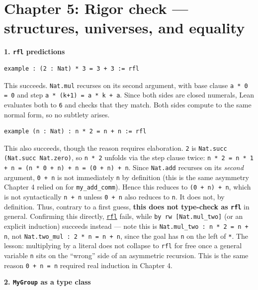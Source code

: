 \section{Chapter 5: Rigor check --- structures, universes, and equality}\label{sec:14-appendix-solutions:04-chapter-5:1}

\textbf{1. \texttt{rfl} predictions}

\begin{lstlisting}
example : (2 : Nat) * 3 = 3 + 3 := rfl
\end{lstlisting}

This succeeds. \texttt{Nat.mul} recurses on its second argument, with base clause \texttt{a * 0 = 0} and step \texttt{a * (k+1) = a * k + a}. Since both sides are closed numerals, Lean evaluates both to \texttt{6} and checks that they match. Both sides compute to the same normal form, so no subtlety arises.

\begin{lstlisting}
example (n : Nat) : n * 2 = n + n := rfl
\end{lstlisting}

This also succeeds, though the reason requires elaboration. \texttt{2} is \texttt{Nat.succ (Nat.succ Nat.zero)}, so \texttt{n * 2} unfolds via the step clause twice: \texttt{n * 2 = n * 1 + n = (n * 0 + n) + n = (0 + n) + n}. Since \texttt{Nat.add} recurses on its \emph{second} argument, \texttt{0 + n} is not immediately \texttt{n} by definition (this is the same asymmetry Chapter 4 relied on for \texttt{my\_\allowbreak{}add\_\allowbreak{}comm}). Hence this reduces to \texttt{(0 + n) + n}, which is not syntactically \texttt{n + n} unless \texttt{0 + n} also reduces to \texttt{n}. It does not, by definition. Thus, contrary to a first guess, \textbf{this does not type-check as \texttt{rfl}} in general. Confirming this directly, \href{https://lean-lang.org/doc/reference/latest/Tactic-Proofs/Tactic-Reference/}{\texttt{rfl}} fails, while \texttt{by rw [Nat.mul\_\allowbreak{}two]} (or an explicit induction) succeeds instead --- note this is \texttt{Nat.mul\_\allowbreak{}two : n * 2 = n + n}, not \texttt{Nat.two\_\allowbreak{}mul : 2 * n = n + n}, since the goal has \texttt{n} on the left of \texttt{*}. The lesson: multiplying by a literal does not collapse to \texttt{rfl} for free once a general variable \texttt{n} sits on the ``wrong'' side of an asymmetric recursion. This is the same reason \texttt{0 + n = n} required real induction in Chapter 4.

\textbf{2. \texttt{MyGroup} as a type class}

